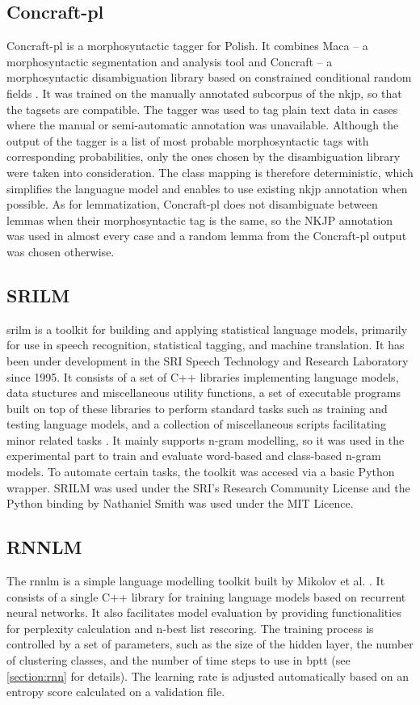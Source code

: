\subsection{Concraft-pl}
Concraft-pl is a morphosyntactic tagger for Polish. It combines Maca -- a morphosyntactic segmentation and analysis tool and Concraft -- a morphosyntactic disambiguation library based on constrained conditional random fields \cite{waszczuk2012harnessing}. It was trained on the manually annotated subcorpus of the \gls{nkjp}, so that the tagsets are compatible. The tagger was used to tag plain text data in cases where the manual or semi-automatic annotation was unavailable. Although the output of the tagger is a list of most probable morphosyntactic tags with corresponding probabilities, only the ones chosen by the disambiguation library were taken into consideration. The class mapping is therefore deterministic, which simplifies the languague model and enables to use existing \gls{nkjp} annotation when possible. As for lemmatization, Concraft-pl does not disambiguate between lemmas when their morphosyntactic tag is the same, so the NKJP annotation was used in almost every case and a random lemma from the Concraft-pl output was chosen otherwise.

\subsection{SRILM}
\gls{srilm} is a toolkit for building and applying statistical language models, primarily for use in speech recognition, statistical tagging, and machine translation. It has been under development in the SRI Speech Technology and Research Laboratory since 1995. It consists of a set of C++ libraries implementing language models, data stuctures and miscellaneous utility functions, a set of executable programs built on top of these libraries to perform standard tasks such as training and testing language models, and a collection of miscellaneous scripts facilitating minor related tasks \cite{stolcke2011srilm}. It mainly supports n-gram modelling, so it was used in the experimental part to train and evaluate \mbox{word-based} and \mbox{class-based} \mbox{n-gram} models. To automate certain tasks, the toolkit was accesed via a basic Python wrapper. SRILM was used under the SRI's Research Community License and the Python binding by Nathaniel Smith was used under the MIT Licence.
\subsection{RNNLM}
The \gls{rnnlm} is a simple language modelling toolkit built by Mikolov et al. \cite{mikolov2011extensions}. It consists of a single C++ library for training language models based on recurrent neural networks. It also facilitates model evaluation by providing functionalities for perplexity calculation and n-best list rescoring. The training process is controlled by a set of parameters, such as the size of the hidden layer, the number of clustering classes, and the number of time steps to use in \gls{bptt} (see \ref{section:rnn} for details). The learning rate is adjusted automatically based on an entropy score calculated on a validation file.
